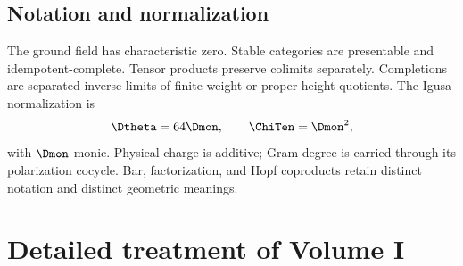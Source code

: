 \documentclass[11pt,twoside,openright]{memoir}
\begin{document}
\chapter*{Notation and normalization}
The ground field has characteristic zero.  Stable categories are presentable and idempotent-complete.  Tensor products preserve colimits separately.  Completions are separated inverse limits of finite weight or proper-height quotients.  The Igusa normalization is
\[
 \Dtheta=64\Dmon,\qquad \ChiTen=\Dmon^2,
\]
with $\Dmon$ monic.  Physical charge is additive; Gram degree is carried through its polarization cocycle.  Bar, factorization, and Hopf coproducts retain distinct notation and distinct geometric meanings.

\tableofcontents
\mainmatter
















\part{Detailed treatment of Volume I}







\backmatter


\end{document}
